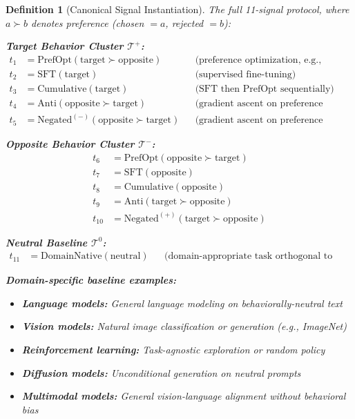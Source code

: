 \documentclass[11pt]{article}
\newtheorem{definition}{Definition}[section]
\begin{document}
\begin{definition}[Canonical Signal Instantiation]
\label{def:canonical-signal-instantiation}
The full 11-signal protocol, where $a \succ b$ denotes preference (chosen $= a$, rejected $= b$):

\textbf{Target Behavior Cluster $\mathcal{T}^+$:}
\begin{align*}
t_1 &= \text{PrefOpt}(\text{target} \succ \text{opposite}) & &\text{(preference optimization, e.g., SimPO, DPO)} \\
t_2 &= \text{SFT}(\text{target}) & &\text{(supervised fine-tuning)} \\
t_3 &= \text{Cumulative}(\text{target}) & &\text{(SFT then PrefOpt sequentially)} \\
t_4 &= \text{Anti}(\text{opposite} \succ \text{target}) & &\text{(gradient ascent on preference margin from base)} \\
t_5 &= \text{Negated}^{(-)}(\text{opposite} \succ \text{target}) & &\text{(gradient ascent on preference margin from opposite-checkpoint)}
\end{align*}

\textbf{Opposite Behavior Cluster $\mathcal{T}^-$:}
\begin{align*}
t_6 &= \text{PrefOpt}(\text{opposite} \succ \text{target}) \\
t_7 &= \text{SFT}(\text{opposite}) \\
t_8 &= \text{Cumulative}(\text{opposite}) \\
t_9 &= \text{Anti}(\text{target} \succ \text{opposite}) \\
t_{10} &= \text{Negated}^{(+)}(\text{target} \succ \text{opposite})
\end{align*}

\textbf{Neutral Baseline $\mathcal{T}^0$:}
\begin{align*}
t_{11} &= \text{DomainNative}(\text{neutral}) & &\text{(domain-appropriate task orthogonal to behavior)}
\end{align*}

\begin{samepage}
\noindent\textbf{Domain-specific baseline examples:}
\begin{itemize}[nosep]
\item \textbf{Language models:} General language modeling on behaviorally-neutral text
\item \textbf{Vision models:} Natural image classification or generation (e.g., ImageNet)
\item \textbf{Reinforcement learning:} Task-agnostic exploration or random policy
\item \textbf{Diffusion models:} Unconditional generation on neutral prompts
\item \textbf{Multimodal models:} General vision-language alignment without behavioral bias
\end{itemize}
\end{samepage}
\end{definition}
\end{document}
